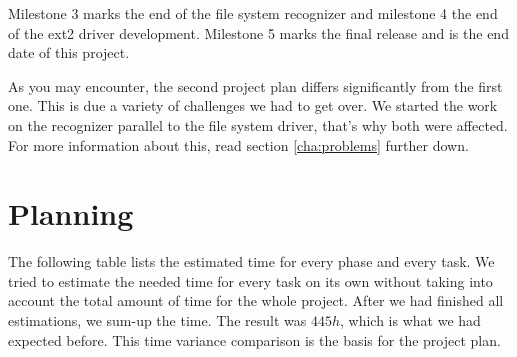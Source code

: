 Milestone 3 marks the end of the file system recognizer and milestone 4 the end of the ext2 driver development. Milestone 5 marks the final release and is the end date of this project.

As you may encounter, the second project plan differs significantly from the first one. This is due a variety of challenges we had to get over. We started the work on the recognizer parallel to the file system driver, that's why both were affected. For more information about this, read section \ref{cha:problems} further down.

\section{Planning}
\label{sec:planning}
The following table lists the estimated time for every phase and every task. We tried to estimate the needed time for every task on its own without taking into account the total amount of time for the whole project. After we had finished all estimations, we sum-up the time. The result was $445 h$, which is what we had expected before. This time variance comparison is the basis for the project plan.

